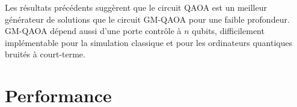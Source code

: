Les résultats précédents suggèrent que le circuit QAOA est un meilleur générateur de solutions que le circuit GM-QAOA pour une faible profondeur. GM-QAOA dépend aussi d'une porte contrôle à $n$ qubits, difficilement implémentable pour la simulation classique et pour les ordinateurs quantiques bruités à court-terme. 


\section{Performance}
\label{sec:performance}

